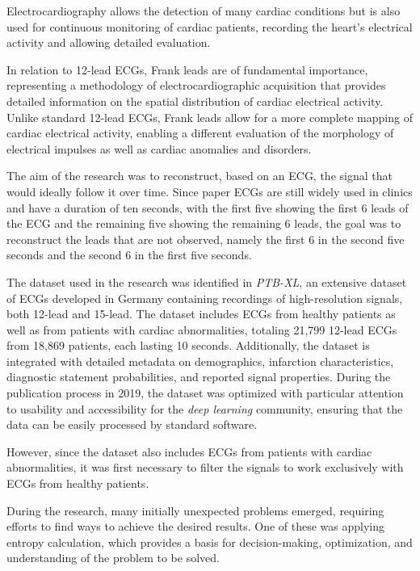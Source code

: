 \documentclass[12pt,english]{report}
\begin{document}
Electrocardiography allows the detection of many cardiac conditions but is also used for continuous monitoring of cardiac patients, recording the heart's electrical activity and allowing detailed evaluation.

In relation to 12-lead ECGs, Frank leads are of fundamental importance, representing a methodology of electrocardiographic acquisition that provides detailed information on the spatial distribution of cardiac electrical activity. Unlike standard 12-lead ECGs, Frank leads allow for a more complete mapping of cardiac electrical activity, enabling a different evaluation of the morphology of electrical impulses as well as cardiac anomalies and disorders.

The aim of the research was to reconstruct, based on an ECG, the signal that would ideally follow it over time. Since paper ECGs are still widely used in clinics and have a duration of ten seconds, with the first five showing the first 6 leads of the ECG and the remaining five showing the remaining 6 leads, the goal was to reconstruct the leads that are not observed, namely the first 6 in the second five seconds and the second 6 in the first five seconds.

The dataset used in the research was identified in \textit{PTB-XL}, an extensive dataset of ECGs developed in Germany containing recordings of high-resolution signals, both 12-lead and 15-lead. The dataset includes ECGs from healthy patients as well as from patients with cardiac abnormalities, totaling 21,799 12-lead ECGs from 18,869 patients, each lasting 10 seconds. Additionally, the dataset is integrated with detailed metadata on demographics, infarction characteristics, diagnostic statement probabilities, and reported signal properties. During the publication process in 2019, the dataset was optimized with particular attention to usability and accessibility for the \textit{deep learning} community, ensuring that the data can be easily processed by standard software.

However, since the dataset also includes ECGs from patients with cardiac abnormalities, it was first necessary to filter the signals to work exclusively with ECGs from healthy patients.

During the research, many initially unexpected problems emerged, requiring efforts to find ways to achieve the desired results. One of these was applying entropy calculation, which provides a basis for decision-making, optimization, and understanding of the problem to be solved.
\end{document}
